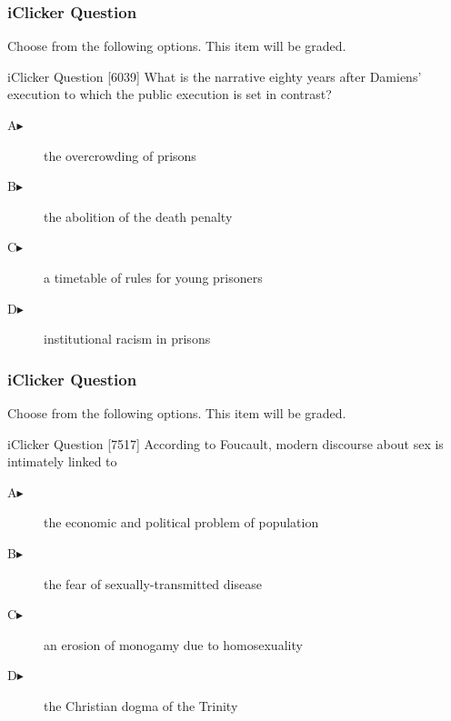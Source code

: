 \documentclass[xcolor=dvipsnames]{beamer}
\begin{document}
\begin{frame}
  \frametitle{iClicker Question}
Choose from the following options. This item will be graded.
\begin{block}{iClicker Question}
[6039] What is the narrative eighty years after Damiens' execution to which
the public execution is set in contrast?
\end{block}
\begin{description}
\item[A\hspace{.2in}$\blacktriangleright$] the overcrowding of prisons
\item[B\hspace{.2in}$\blacktriangleright$] the abolition of the death penalty
\item[C\hspace{.2in}$\blacktriangleright$] a timetable of rules for young prisoners
\item[D\hspace{.2in}$\blacktriangleright$] institutional racism in prisons
\end{description}
\end{frame}


\begin{frame}
  \frametitle{iClicker Question}
Choose from the following options. This item will be graded.
\begin{block}{iClicker Question}
[7517] According to Foucault, modern discourse about sex is intimately linked to
\end{block}
\begin{description}
\item[A\hspace{.2in}$\blacktriangleright$] the economic and political problem of population
\item[B\hspace{.2in}$\blacktriangleright$] the fear of sexually-transmitted disease
\item[C\hspace{.2in}$\blacktriangleright$] an erosion of monogamy due to homosexuality
\item[D\hspace{.2in}$\blacktriangleright$] the Christian dogma of the Trinity
\end{description}
\end{frame}
\end{document}
